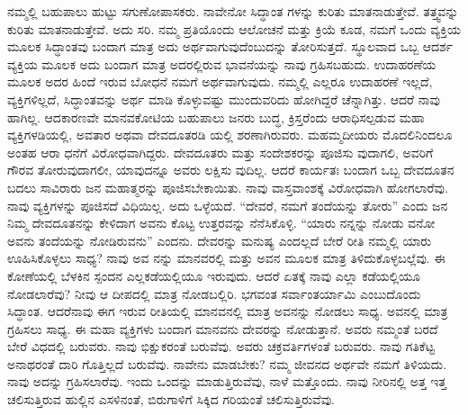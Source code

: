ನಮ್ಮಲ್ಲಿ ಬಹುಪಾಲು ಹುಟ್ಟು ಸಗುಣೋಪಾಸಕರು. ನಾವೇನೋ ಸಿದ್ಧಾಂತ ಗಳನ್ನು ಕುರಿತು ಮಾತನಾಡುತ್ತೇವೆ. ತತ್ತ್ವವನ್ನು ಕುರಿತು ಮಾತನಾಡುತ್ತೇವೆ. ಅದು ಸರಿ. ನಮ್ಮ ಪ್ರತಿಯೊಂದು ಆಲೋಚನೆ ಮತ್ತು ಕ್ರಿಯೆ ಕೂಡ, ನಮಗೆ ಒಂದು ವ್ಯಕ್ತಿಯ ಮೂಲಕ ಸಿದ್ಧಾಂತವು ಬಂದಾಗ ಮಾತ್ರ ಅದು ಅರ್ಥವಾಗುವುದೆಂಬುದನ್ನು ತೋರಿಸುತ್ತದೆ. ಸ್ಥೂಲವಾದ ಒಬ್ಬ ಆದರ್ಶ ವ್ಯಕ್ತಿಯ ಮೂಲಕ ಅದು ಬಂದಾಗ ಮಾತ್ರ ಅದರಲ್ಲಿರುವ ಭಾವನೆಯನ್ನು ನಾವು ಗ್ರಹಿಸಬಹುದು. ಉದಾಹರಣೆಯ ಮೂಲಕ ಅದರ ಹಿಂದೆ ಇರುವ ಬೋಧನೆ ನಮಗೆ ಅರ್ಥವಾಗುವುದು. ನಮ್ಮಲ್ಲಿ ಎಲ್ಲರೂ ಉದಾಹರಣೆ ಇಲ್ಲದೆ, ವ್ಯಕ್ತಿಗಳಿಲ್ಲದೆ, ಸಿದ್ಧಾಂತವನ್ನು ಅರ್ಥ ಮಾಡಿ ಕೊಳ್ಳುವಷ್ಟು ಮುಂದುವರಿದು ಹೋಗಿದ್ದರೆ ಚೆನ್ನಾಗಿತ್ತು. ಆದರೆ ನಾವು ಹಾಗಿಲ್ಲ. ಆದಕಾರಣವೇ ಮಾನವಕೋಟಿಯ ಬಹುಪಾಲು ಜನರು ಬುದ್ಧ, ಕ್ರಿಸ್ತರೆಂದು ಆರಾಧಿಸಲ್ಪಡುವ ಮಹಾ ವ್ಯಕ್ತಿಗಳಡಿಯಲ್ಲಿ, ಅವತಾರ ಅಥವಾ ದೇವದೂತರಡಿ ಯಲ್ಲಿ ಶರಣಾಗಿರುವರು. ಮಹಮ್ಮದೀಯರು ಮೊದಲಿನಿಂದಲೂ ಅಂತಹ ಆರಾ ಧನೆಗೆ ವಿರೋಧವಾಗಿದ್ದರು. ದೇವದೂತರು ಮತ್ತು ಸಂದೇಶಕರನ್ನು ಪೂಜಿಸು ವುದಾಗಲಿ, ಅವರಿಗೆ ಗೌರವ ತೋರುವುದಾಗಲೀ, ಯಾವುದನ್ನೂ ಅವರು ಲಕ್ಷಿಸು ವುದಿಲ್ಲ. ಆದರೆ ಕಾರ್ಯತಃ ಬಂದಾಗ ಒಬ್ಬ ದೇವದೂತನ ಬದಲು ಸಾವಿರಾರು ಜನ ಮಹಾತ್ಮರನ್ನು ಪೂಜಿಸಬೇಕಾಯಿತು. ನಾವು ವಾಸ್ತವಾಂಶಕ್ಕೆ ವಿರೋಧವಾಗಿ ಹೋಗಲಾರೆವು. ನಾವು ವ್ಯಕ್ತಿಗಳನ್ನು ಪೂಜಿಸದೆ ವಿಧಿಯಿಲ್ಲ. ಅದು ಒಳ್ಳೆಯದೆ. “ದೇವರೆ, ನಮಗೆ ತಂದೆಯನ್ನು ತೋರು” ಎಂದು ಜನ ನಿಮ್ಮ ದೇವದೂತನನ್ನು ಕೇಳಿದಾಗ ಅವನು ಕೊಟ್ಟ ಉತ್ತರವನ್ನು ನೆನೆಸಿಕೊಳ್ಳಿ. “ಯಾರು ನನ್ನನ್ನು ನೋಡು ವನೋ ಅವನು ತಂದೆಯನ್ನು ನೋಡಿರುವನು” ಎಂದನು. ದೇವರನ್ನು ಮನುಷ್ಯ ಎಂದಲ್ಲದೆ ಬೇರೆ ರೀತಿ ನಮ್ಮಲ್ಲಿ ಯಾರು ಊಹಿಸಿಕೊಳ್ಳಲು ಸಾಧ್ಯ? ನಾವು ಅವ ನನ್ನು ಮಾನವರಲ್ಲಿ ಮತ್ತು ಅವನ ಮೂಲಕ ಮಾತ್ರ ತಿಳಿದುಕೊಳ್ಳಬಲ್ಲೆವು. ಈ ಕೋಣೆಯಲ್ಲಿ ಬೆಳಕಿನ ಸ್ಪಂದನ ಎಲ್ಲಕಡೆಯಲ್ಲಿಯೂ ಇರುವುದು. ಆದರೆ ಏತಕ್ಕೆ ನಾವು ಎಲ್ಲಾ ಕಡೆಯಲ್ಲಿಯೂ ನೋಡಲಾರೆವು? ನೀವು ಆ ದೀಪದಲ್ಲಿ ಮಾತ್ರ ನೋಡಬಲ್ಲಿರಿ. ಭಗವಂತ ಸರ್ವಾಂತರ್ಯಾಮಿ ಎಂಬುದೊಂದು ಸಿದ್ಧಾಂತ. ಆದರೆನಾವು ಈಗ ಇರುವ ರೀತಿಯಲ್ಲಿ ಮಾನವನಲ್ಲಿ ಮಾತ್ರ ಅವನನ್ನು ನೋಡಲು ಸಾಧ್ಯ. ಅವನಲ್ಲಿ ಮಾತ್ರ ಗ್ರಹಿಸಲು ಸಾಧ್ಯ. ಈ ಮಹಾ ವ್ಯಕ್ತಿಗಳು ಬಂದಾಗ ಮಾನವನು ದೇವರನ್ನು ನೋಡುತ್ತಾನೆ. ಅವರು ನಮ್ಮಂತೆ ಬರದೆ ಬೇರೆ ವಿಧದಲ್ಲಿ ಬರುವರು. ನಾವು ಭಿಕ್ಷುಕರಂತೆ ಬರುವೆವು. ಅವರು ಚಕ್ರವರ್ತಿಗಳಂತೆ ಬರುವರು. ನಾವು ಗತಿಕೆಟ್ಟ ಅನಾಥರಂತೆ ದಾರಿ ಗೊತ್ತಿಲ್ಲದೆ ಬರುವೆವು. ನಾವೇನು ಮಾಡಬೇಕು? ನಮ್ಮ ಜೀವನದ ಅರ್ಥವೇ ನಮಗೆ ತಿಳಿಯದು. ನಾವು ಅದನ್ನು ಗ್ರಹಿಸಲಾರೆವು. ಇಂದು ಒಂದನ್ನು ಮಾಡುತ್ತಿರುವೆವು, ನಾಳೆ ಮತ್ತೊಂದು. ನಾವು ನೀರಿನಲ್ಲಿ ಅತ್ತ ಇತ್ತ ಚಲಿಸುತ್ತಿರುವ ಹುಲ್ಲಿನ ಎಸಳಿನಂತೆ, ಬಿರುಗಾಳಿಗೆ ಸಿಕ್ಕಿದ ಗರಿಯಂತೆ ಚಲಿಸುತ್ತಿರುವೆವು.

